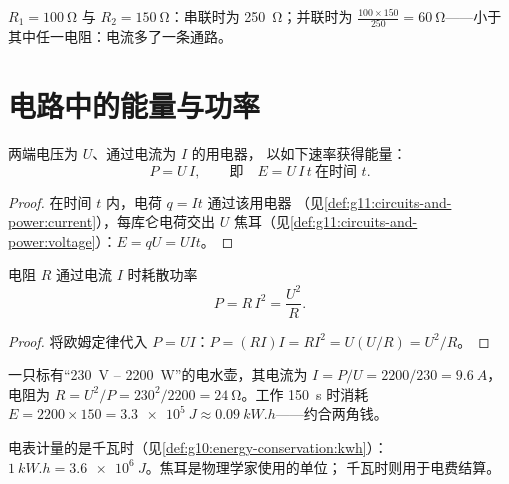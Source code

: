 \begin{example}[等效电阻]\label{ex:g11:circuits-and-power:networks}
$R_1 = \qty{100}{\ohm}$ 与 $R_2 = \qty{150}{\ohm}$：串联时为
\qty{250}{\ohm}；并联时为 $\frac{100 \times 150}{250} =
\qty{60}{\ohm}$——小于其中任一电阻：电流多了一条通路。
\end{example}

\section{电路中的能量与功率}

\begin{proposition}[电功率]\label{prop:g11:circuits-and-power:power}
两端电压为 $U$、通过电流为 $I$ 的用电器，
以如下速率获得能量：
\[ P = U\,I , \qquad\text{即}\quad E = U\,I\,t \ \text{在时间 } t . \]
\end{proposition}

\begin{proof}
在时间 $t$ 内，电荷 $q = It$ 通过该用电器
（见\cref{def:g11:circuits-and-power:current}），每库仑电荷交出
$U$ 焦耳（见\cref{def:g11:circuits-and-power:voltage}）：$E = qU = UIt$。
\end{proof}

\begin{proposition}[电阻的功率]\label{prop:g11:circuits-and-power:ri2}
电阻 $R$ 通过电流 $I$ 时耗散功率
\[ P = R\,I^2 = \frac{U^2}{R} . \]
\end{proposition}

\begin{proof}
将欧姆定律代入 $P = UI$：$P = (RI)I = RI^2 = U(U/R) = U^2/R$。
\end{proof}

\begin{example}[读取铭牌]\label{ex:g11:circuits-and-power:nameplate}
一只标有“\qty{230}{V} -- \qty{2200}{W}”的电水壶，其电流为 $I = P/U =
2200/230 = \qty{9.6}{A}$，电阻为 $R = U^2/P = 230^2/2200 =
\qty{24}{\ohm}$。工作 \qty{150}{s} 时消耗 $E = 2200 \times 150 =
\qty{3.3e5}{J} \approx \qty{0.09}{kW.h}$——约合两角钱。
\end{example}

\begin{remark}[焦耳与千瓦时]\label{rem:g11:circuits-and-power:kwh}
电表计量的是千瓦时（见\cref{def:g10:energy-conservation:kwh}）：
$\qty{1}{kW.h} = \qty{3.6e6}{J}$。焦耳是物理学家使用的单位；
千瓦时则用于电费结算。
\end{remark}

